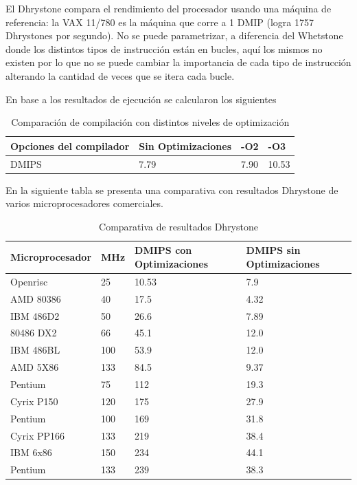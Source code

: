 El Dhrystone compara el rendimiento del procesador usando una máquina de referencia: la VAX 11/780 es la máquina que corre a 1 DMIP (logra 1757
Dhrystones por segundo). No se puede parametrizar, a diferencia del Whetstone donde los distintos tipos de instrucción están en bucles, aquí los
mismos no existen por lo que no se puede cambiar la importancia de cada tipo de instrucción alterando la cantidad de veces que se itera cada bucle.

En base a los resultados de ejecución se calcularon los siguientes 

\begin{table}[h!]
\begin{center}
\begin{tabular}{ |l |l |l |l |}
\hline
\rowcolor[gray]{0.8} Opciones del compilador & Sin Optimizaciones & -O2 &-O3 \\
\hline
DMIPS 					& 7.79 			&   7.90  &  10.53  \\
\hline
\end{tabular}
\end{center}
\caption{Comparación de compilación con distintos niveles de optimización}
\end{table}


En la siguiente tabla se presenta una comparativa con resultados Dhrystone de varios microprocesadores comerciales.

\begin{table}[h!]
\begin{center}
\begin{tabular}{ |l |l |l |l |}
\hline
\rowcolor[gray]{0.8} Microprocesador& MHz & DMIPS con Optimizaciones & DMIPS sin Optimizaciones \\
\hline
Openrisc		  &25	&10.53	&7.9\\
\hline
AMD 80386         &40   &17.5   &4.32\\
\hline
IBM 486D2         &50   &26.6   &7.89\\
\hline
80486 DX2         &66   &45.1   &12.0\\
\hline
IBM 486BL        &100   &53.9   &12.0\\
\hline
AMD 5X86         &133   &84.5   &9.37\\
\hline
Pentium           &75    &112   &19.3\\
\hline
Cyrix P150       &120    &175   &27.9\\
\hline
Pentium          &100    &169   &31.8\\
\hline
Cyrix PP166      &133    &219   &38.4\\
\hline
IBM 6x86         &150    &234   &44.1\\
\hline
Pentium          &133    &239   &38.3\\
\hline
\end{tabular}
\end{center}
\caption{Comparativa de resultados Dhrystone}
\end{table}

